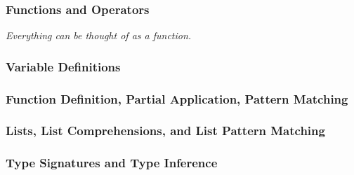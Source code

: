 \begin{frame}[fragile]
  \frametitle{Functions and Operators}
  \pause
  
  \pause
  \emph{Everything can be thought of as a function.}
\end{frame}

\begin{frame}[fragile]
  \frametitle{Variable Definitions}
  \pause
  
\end{frame}

\begin{frame}[fragile]
  \frametitle{Function Definition, Partial Application, Pattern Matching}
  \pause
  
\end{frame}

\begin{frame}[fragile]
  \frametitle{Lists, List Comprehensions, and List Pattern Matching}
  \pause
  
\end{frame}

\begin{frame}[fragile]
  \frametitle{Type Signatures and Type Inference}
  \pause
  
\end{frame}
